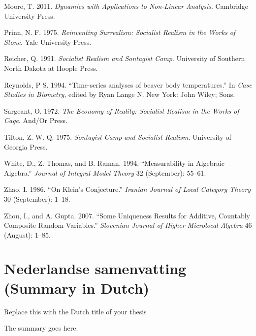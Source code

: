 \documentclass[12pt,english,a4paper,oneside,]{book} %
\newenvironment{dutch}[2][]{\begin{otherlanguage}{dutch}}{\end{otherlanguage}}
\theoremstyle{definition}
\theoremstyle{definition}
\theoremstyle{definition}
\theoremstyle{remark}
\begin{document}
\leavevmode\hypertarget{ref-cite:18}{}%
Moore, T. 2011. \emph{Dynamics with Applications to Non-Linear Analysis}. Cambridge University Press.

\leavevmode\hypertarget{ref-Prinn1975}{}%
Prinn, N. F. 1975. \emph{Reinventing Surrealism: Socialist Realism in the Works of Stone}. Yale University Press.

\leavevmode\hypertarget{ref-Reicher1991}{}%
Reicher, Q. 1991. \emph{Socialist Realism and Sontagist Camp}. University of Southern North Dakota at Hoople Press.

\leavevmode\hypertarget{ref-Reynolds1994}{}%
Reynolds, P S. 1994. ``Time-series analyses of beaver body temperatures.'' In \emph{Case Studies in Biometry}, edited by Ryan Lange N. New York: John Wiley; Sons.

\leavevmode\hypertarget{ref-Sargeant1972}{}%
Sargeant, O. 1972. \emph{The Economy of Reality: Socialist Realism in the Works of Cage}. And/Or Press.

\leavevmode\hypertarget{ref-Tilton1975}{}%
Tilton, Z. W. Q. 1975. \emph{Sontagist Camp and Socialist Realism}. University of Georgia Press.

\leavevmode\hypertarget{ref-cite:31}{}%
White, D., Z. Thomas, and B. Raman. 1994. ``Measurability in Algebraic Algebra.'' \emph{Journal of Integral Model Theory} 32 (September): 55--61.

\leavevmode\hypertarget{ref-cite:9}{}%
Zhao, I. 1986. ``On Klein's Conjecture.'' \emph{Iranian Journal of Local Category Theory} 30 (September): 1--18.

\leavevmode\hypertarget{ref-cite:22}{}%
Zhou, I., and A. Gupta. 2007. ``Some Uniqueness Results for Additive, Countably Composite Random Variables.'' \emph{Slovenian Journal of Higher Microlocal Algebra} 46 (August): 1--85.

\endgroup

\hypertarget{nederlandse-samenvatting-summary-in-dutch}{%
\chapter*{Nederlandse samenvatting (Summary in Dutch)}\label{nederlandse-samenvatting-summary-in-dutch}}


\begin{dutch}

\emph{Replace this with the Dutch title of your thesis}

\bigskip

The summary goes here.

\end{dutch}
\end{document}
